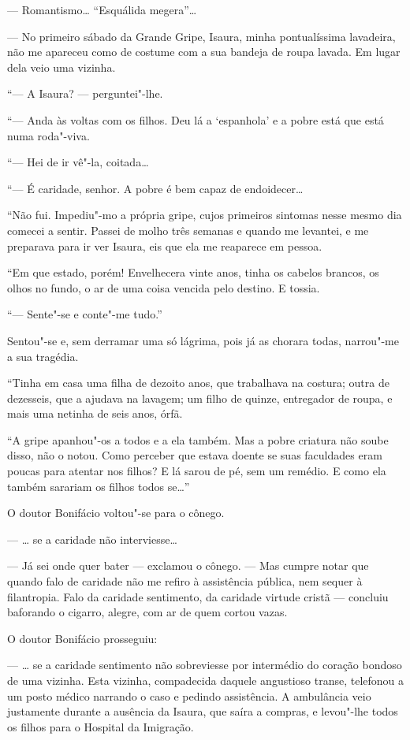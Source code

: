 --- Romantismo\ldots{} ``Esquálida megera''\ldots{}

--- No primeiro sábado da Grande Gripe, Isaura, minha pontualíssima
lavadeira, não me apareceu como de costume com a sua bandeja de roupa
lavada. Em lugar dela veio uma vizinha.

``--- A Isaura? --- perguntei"-lhe.

``--- Anda às voltas com os filhos. Deu lá a `espanhola' e a pobre está
que está numa roda"-viva.

``--- Hei de ir vê"-la, coitada\ldots{}

``--- É caridade, senhor. A pobre é bem capaz de endoidecer\ldots{}

``Não fui. Impediu"-mo a própria gripe, cujos primeiros sintomas nesse
mesmo dia comecei a sentir. Passei de molho três semanas e quando me
levantei, e me preparava para ir ver Isaura, eis que ela me reaparece em
pessoa.

``Em que estado, porém! Envelhecera vinte anos, tinha os cabelos
brancos, os olhos no fundo, o ar de uma coisa vencida pelo destino. E
tossia.

``--- Sente"-se e conte"-me tudo.''

Sentou"-se e, sem derramar uma só lágrima, pois já as chorara todas,
narrou"-me a sua tragédia.

``Tinha em casa uma filha de dezoito anos, que trabalhava na costura;
outra de dezesseis, que a ajudava na lavagem; um filho de quinze,
entregador de roupa, e mais uma netinha de seis anos, órfã.

``A gripe apanhou"-os a todos e a ela também. Mas a pobre criatura não
soube disso, não o notou. Como perceber que estava doente se suas
faculdades eram poucas para atentar nos filhos? E lá sarou de pé, sem um
remédio. E como ela também sarariam os filhos todos se\ldots{}''

O doutor Bonifácio voltou"-se para o cônego.

--- \ldots{} se a caridade não interviesse\ldots{}

--- Já sei onde quer bater --- exclamou o cônego. --- Mas cumpre notar
que quando falo de caridade não me refiro à assistência pública, nem
sequer à filantropia. Falo da caridade sentimento, da caridade virtude
cristã --- concluiu baforando o cigarro, alegre, com ar de quem cortou
vazas.

O doutor Bonifácio prosseguiu:

--- \ldots{} se a caridade sentimento não sobreviesse por intermédio do
coração bondoso de uma vizinha. Esta vizinha, compadecida daquele
angustioso transe, telefonou a um posto médico narrando o caso e pedindo
assistência. A ambulância veio justamente durante a ausência da Isaura,
que saíra a compras, e levou"-lhe todos os filhos para o Hospital da
Imigração.

